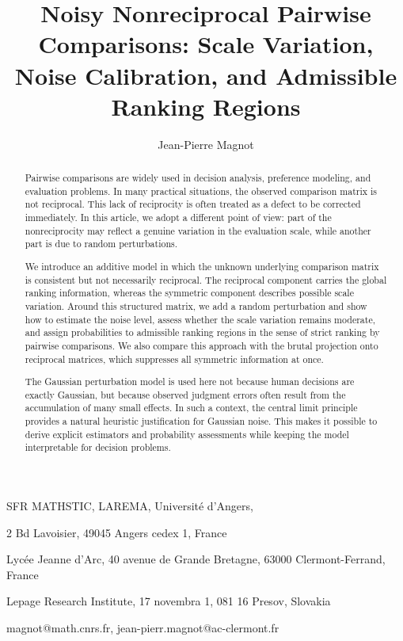\documentclass[11pt]{amsart}
\title[Non reciprocal PCs with noise]{Noisy Nonreciprocal Pairwise Comparisons:
Scale Variation, Noise Calibration, and Admissible Ranking Regions}
\author{Jean-Pierre Magnot}
\theoremstyle{definition}
\theoremstyle{plain}
\numberwithin{equation}{section}
\begin{document}
\onehalfspacing

\maketitle

\begin{center}



{SFR MATHSTIC, LAREMA, Universit\'e d’Angers, 

2 Bd Lavoisier, 
49045 Angers cedex 1, France}

{Lyc\'ee Jeanne d'Arc, 40 avenue de Grande Bretagne, 63000 Clermont-Ferrand, 
France}


{Lepage Research Institute, 17 novembra 1, 081 16 Presov, Slovakia}

{magnot@math.cnrs.fr, jean-pierr.magnot@ac-clermont.fr}
\end{center}
\date{}


\begin{abstract}
Pairwise comparisons are widely used in decision analysis, preference modeling, and evaluation problems. In many practical situations, the observed comparison matrix is not reciprocal. This lack of reciprocity is often treated as a defect to be corrected immediately. In this article, we adopt a different point of view: part of the nonreciprocity may reflect a genuine variation in the evaluation scale, while another part is due to random perturbations.

We introduce an additive model in which the unknown underlying comparison matrix is consistent but not necessarily reciprocal. The reciprocal component carries the global ranking information, whereas the symmetric component describes possible scale variation. Around this structured matrix, we add a random perturbation and show how to estimate the noise level, assess whether the scale variation remains moderate, and assign probabilities to admissible ranking regions in the sense of strict ranking by pairwise comparisons. We also compare this approach with the brutal projection onto reciprocal matrices, which suppresses all symmetric information at once.

The Gaussian perturbation model is used here not because human decisions are exactly Gaussian, but because observed judgment errors often result from the accumulation of many small effects. In such a context, the central limit principle provides a natural heuristic justification for Gaussian noise. This makes it possible to derive explicit estimators and probability assessments while keeping the model interpretable for decision problems.
\end{abstract}
\end{document}
